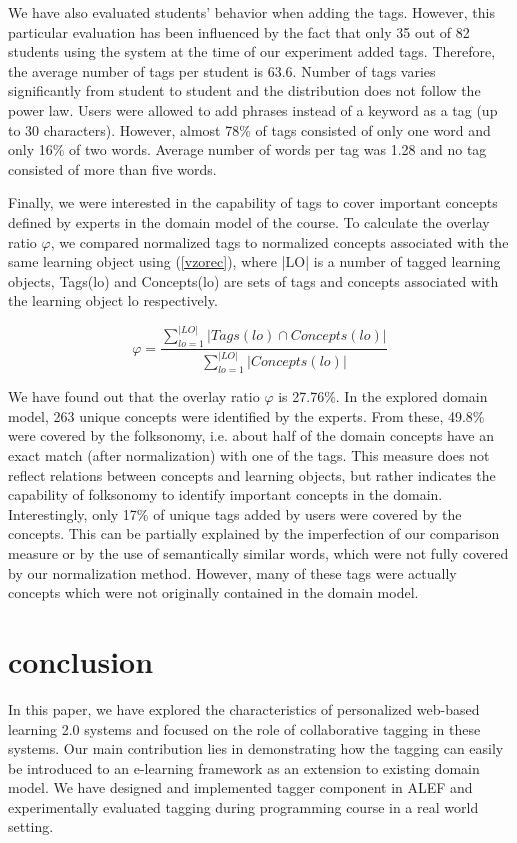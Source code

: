 \documentclass{IEEEtran}     %
\begin{document}
We have also evaluated students' behavior when adding
the tags. However, this particular evaluation has been
influenced by the fact that only 35 out of 82 students using
the system at the time of our experiment added tags.
Therefore, the average number of tags per student is 63.6.
Number of tags varies significantly from student to student
and the distribution does not follow the power law. Users
were allowed to add phrases instead of a keyword as a tag 
(up to 30 characters). However, almost 78\% of tags consisted
of only one word and only 16\% of two words. Average
number of words per tag was 1.28 and no tag consisted of
more than five words.

Finally, we were interested in the capability of tags to
cover important concepts defined by experts in the domain
model of the course. To calculate the overlay ratio  $\varphi$, we
compared normalized tags to normalized concepts associated
with the same learning object using (\ref{vzorec}), where |LO| is a
number of tagged learning objects, Tags(lo) and
Concepts(lo) are sets of tags and concepts associated with
the learning object lo respectively.

\begin{equation}    %
\label{eq:1}
\varphi = \frac{\sum_{lo=1}^{|LO|} |Tags(lo)\cap Concepts(lo)|}{\sum_{lo=1}^{|LO|} |Concepts(lo)|}
\label{vzorec}
\end{equation}

We have found out that the overlay ratio $\varphi$  is 27.76\%. In  %
the explored domain model, 263 unique concepts were
identified by the experts. From these, 49.8\% were covered
by the folksonomy, i.e. about half of the domain concepts
have an exact match (after normalization) with one of the
tags. This measure does not reflect relations between
concepts and learning objects, but rather indicates the
capability of folksonomy to identify important concepts in
the domain. Interestingly, only 17\% of unique tags added by
users were covered by the concepts. This can be partially
explained by the imperfection of our comparison measure or
by the use of semantically similar words, which were not
fully covered by our normalization method. However, many
of these tags were actually concepts which were not
originally contained in the domain model.

\section{conclusion}
In this paper, we have explored the characteristics of
personalized web-based learning 2.0 systems and focused on
the role of collaborative tagging in these systems. Our main
contribution lies in demonstrating how the tagging can easily
be introduced to an e-learning framework as an extension to
existing domain model. We have designed and implemented
tagger component in ALEF and experimentally evaluated
tagging during programming course in a real world setting.
\end{document}
